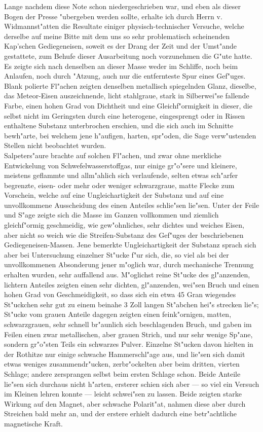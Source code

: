 \documentclass[a4paper, 11pt, oneside, german]{article}
\begin{document}
{Lange nachdem diese Note schon niedergeschrieben war, und eben als dieser Bogen der Presse "ubergeben werden sollte, erhalte ich durch Herrn v. Widmannst"atten die Resultate einiger physisch-technischer Versuche, welche derselbe auf meine Bitte mit dem uns so sehr problematisch scheinenden Kap’schen Gediegeneisen, soweit es der Drang der Zeit und der Umst"ande gestattete, zum Behufe dieser Ausarbeitung noch vorzunehmen die G"ute hatte. Es zeigte sich nach denselben an dieser Masse weder im Schliffe, noch beim Anlaufen, noch durch "Atzung, auch nur die entfernteste Spur eines Gef"uges.\\
Blank polierte Fl"achen zeigten denselben metallisch spiegelnden Glanz, dieselbe, das Meteor-Eisen auszeichnende, licht stahlgraue, stark in Silberwei"se fallende Farbe, einen hohen Grad von Dichtheit und eine Gleichf"ormigkeit in dieser, die selbst nicht im Geringsten durch eine heterogene, eingesprengt oder in Rissen enthaltene Substanz unterbrochen erschien, und die sich auch im Schnitte bewh"arte, bei welchem jene h"aufigen, harten, spr"oden, die Sage verw"ustenden Stellen nicht beobachtet wurden.\\
Salpeters"aure brachte auf solchen Fl"achen, und zwar ohne merkliche Entwickelung von Schwefelwasserstoffgas, nur einige gr"o"sere und kleinere, meistens geflammte und allm"ahlich sich verlaufende, selten etwas sch"arfer begrenzte, eisen- oder mehr oder weniger schwarzgraue, matte Flecke zum Vorschein, welche auf eine Ungleichartigkeit der Substanz und auf eine unvollkommene Ausscheidung des einen Anteiles schlie"sen lie"sen. Unter der Feile und S"age zeigte sich die Masse im Ganzen vollkommen und ziemlich gleichf"ormig geschmeidig, wie gew"ohnliches, sehr dichtes und weiches Eisen, aber nicht so weich wie die Streifen-Substanz des Gef"uges der beschriebenen Gediegeneisen-Massen. Jene bemerkte Ungleichartigkeit der Substanz sprach sich aber bei Untersuchung einzelner St"ucke f"ur sich, die, so viel als bei der unvollkommenen Absonderung jener m"oglich war, durch mechanische Trennung erhalten wurden, sehr auffallend aus. M"oglichst reine St"ucke des gl"anzenden, lichtern Anteiles zeigten einen sehr dichten, gl"anzenden, wei"sen Bruch und einen hohen Grad von Geschmeidigkeit, so dass sich ein etwa 45 Gran wiegendes St"uckchen sehr gut zu einem beinahe 3 Zoll langen St"abchen hei"s strecken lie"s; St"ucke vom grauen Anteile dagegen zeigten einen feink"ornigen, matten, schwarzgrauen, sehr schnell br"aunlich sich beschlagenden Bruch, und gaben im Feilen einen zwar metallischen, aber grauen Strich, und nur sehr wenige Sp"ane, sondern gr"o"sten Teils ein schwarzes Pulver. Einzelne St"ucken davon hielten in der Rothitze nur einige schwache Hammerschl"age aus, und lie"sen sich damit etwas weniges zusammendr"ucken, zerbr"ockelten aber beim dritten, vierten Schlage; andere zersprangen selbst beim ersten Schlage schon. Beide Anteile lie"sen sich durchaus nicht h"arten, ersterer schien sich aber --- so viel ein Versuch im Kleinen lehren konnte --- leicht schwei"sen zu lassen. Beide zeigten starke Wirkung auf den Magnet, aber schwache Polarit"at, nahmen diese aber durch Streichen bald mehr an, und der erstere erhielt dadurch eine betr"achtliche magnetische Kraft.\\
}
\end{document}
